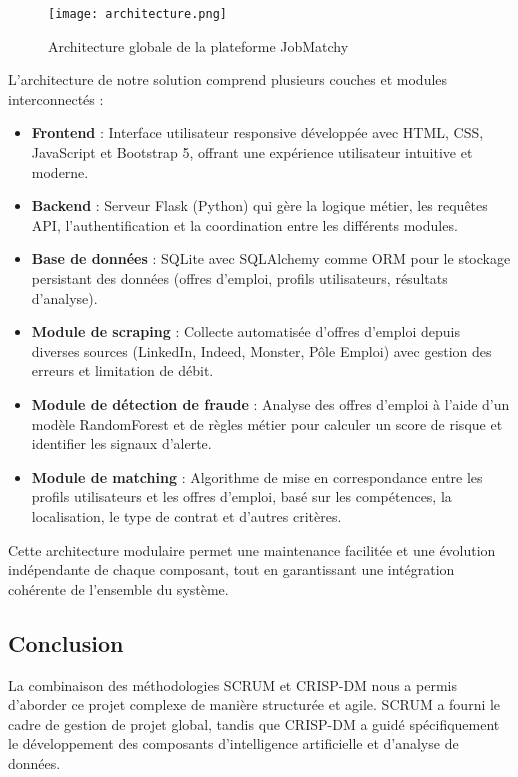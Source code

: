 \documentclass[10pt,a4paper,twocolumn]{article}
\begin{document}
\begin{figure}[H]
\centering
\texttt{[image: architecture.png]}
\caption{Architecture globale de la plateforme JobMatchy}
\end{figure}

L'architecture de notre solution comprend plusieurs couches et modules interconnectés :

\begin{itemize}
    \item \textbf{Frontend} : Interface utilisateur responsive développée avec HTML, CSS, JavaScript et Bootstrap 5, offrant une expérience utilisateur intuitive et moderne.

    \item \textbf{Backend} : Serveur Flask (Python) qui gère la logique métier, les requêtes API, l'authentification et la coordination entre les différents modules.

    \item \textbf{Base de données} : SQLite avec SQLAlchemy comme ORM pour le stockage persistant des données (offres d'emploi, profils utilisateurs, résultats d'analyse).

    \item \textbf{Module de scraping} : Collecte automatisée d'offres d'emploi depuis diverses sources (LinkedIn, Indeed, Monster, Pôle Emploi) avec gestion des erreurs et limitation de débit.

    \item \textbf{Module de détection de fraude} : Analyse des offres d'emploi à l'aide d'un modèle RandomForest et de règles métier pour calculer un score de risque et identifier les signaux d'alerte.

    \item \textbf{Module de matching} : Algorithme de mise en correspondance entre les profils utilisateurs et les offres d'emploi, basé sur les compétences, la localisation, le type de contrat et d'autres critères.
\end{itemize}

Cette architecture modulaire permet une maintenance facilitée et une évolution indépendante de chaque composant, tout en garantissant une intégration cohérente de l'ensemble du système.

\subsection{Conclusion}
La combinaison des méthodologies SCRUM et CRISP-DM nous a permis d'aborder ce projet complexe de manière structurée et agile. SCRUM a fourni le cadre de gestion de projet global, tandis que CRISP-DM a guidé spécifiquement le développement des composants d'intelligence artificielle et d'analyse de données.
\end{document}
